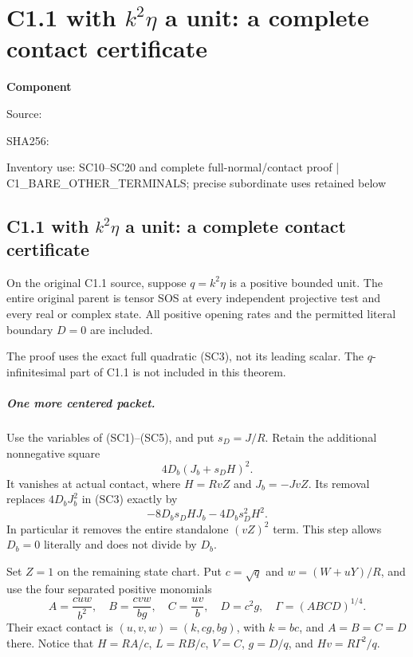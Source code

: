 \chapter{C1.1 with $k^2\eta$ a unit: a complete contact certificate}
\label{component:p95350f69a353}
\noindent\textbf{Component }\par
{\small\noindent Source: \par}
{\small\noindent SHA256: \par}
{\small\noindent Inventory use: SC10--SC20 and complete full-normal/contact proof | C1\_\allowbreak{}BARE\_\allowbreak{}OTHER\_\allowbreak{}TERMINALS; precise subordinate uses retained below\par}
\medskip
\section{C1.1 with $k^2\eta$ a unit: a complete contact certificate}
\label{p95350f69a353:sec:r7-c1-q-unit}
\begin{theorem}
On the original C1.1 source, suppose $q=k^2\eta$ is a positive bounded
unit. The entire original parent is tensor SOS at every independent
projective test and every real or complex state. All positive opening
rates and the permitted literal boundary $D=0$ are included.
\end{theorem}
The proof uses the exact full quadratic (SC3), not its leading scalar.
The $q$-infinitesimal part of C1.1 is not included in this theorem.

\paragraph{One more centered packet.}
Use the variables of (SC1)--(SC5), and put $s_D=J/R$. Retain the
additional nonnegative square
\[
                  4D_b(J_b+s_DH)^2.                 \tag{SC10}
\]
It vanishes at actual contact, where $H=RvZ$ and $J_b=-JvZ$.
Its removal replaces $4D_bJ_b^2$ in (SC3) exactly by
\[
                  -8D_bs_DHJ_b-4D_bs_D^2H^2.
\]
In particular it removes the entire standalone $(vZ)^2$ term.
This step allows $D_b=0$ literally and does not divide by $D_b$.

Set $Z=1$ on the remaining state chart. Put $c=\sqrt q$ and
$w=(W+uY)/R$, and use the four separated positive monomials
\[
 A=\frac{cuw}{b^2},\quad B=\frac{cvw}{bg},\quad
 C=\frac{uv}{b},\quad D=c^2g,\quad
 \Gamma=(ABCD)^{1/4}.
 \tag{SC11}
\]
Their exact contact is $(u,v,w)=(k,cg,bg)$, with $k=bc$, and
$A=B=C=D$ there. Notice that $H=RA/c$, $L=RB/c$, $V=C$,
$g=D/q$, and $Hv=R\Gamma^2/q$.

